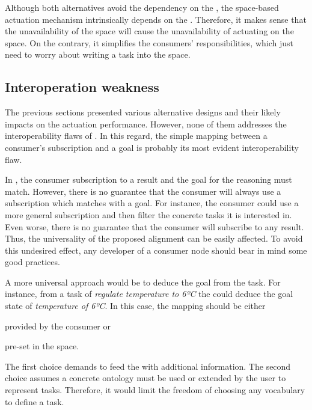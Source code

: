 Although both alternatives avoid the dependency on the \Space{}, the space-based actuation mechanism intrinsically depends on the \Space{}.
Therefore, it makes sense that the unavailability of the space will cause the unavailability of actuating on the space.
On the contrary, it simplifies the consumers' responsibilities, which just need to worry about writing a task into the space.



\subsection{Interoperation weakness}

The previous sections presented various alternative designs and their likely impacts on the actuation performance.
However, none of them addresses the interoperability flaws of \implMix{}.
In this regard, the simple mapping between a consumer's subscription and a goal is probably its most evident interoperability flaw.


In \implMix{}, the consumer subscription to a result and the goal for the reasoning must match.
However, there is no guarantee that the consumer will always use a subscription which matches with a goal.
For instance, the consumer could use a more general subscription and then filter the concrete tasks it is interested in.
Even worse, there is no guarantee that the consumer will subscribe to any result.
Thus, the universality of the proposed alignment can be easily affected.
To avoid this undesired effect, any developer of a consumer node should bear in mind some good practices. %


A more universal approach would be to deduce the goal from the task. %
For instance, from a task of \emph{regulate temperature to 6ºC} the \Space{} could deduce the goal state of \emph{temperature of 6ºC}.
In this case, the mapping should be either
\begin{enumerate*}[label=\itshape(\arabic*\upshape)]
  \item provided by the consumer or
  \item pre-set in the space.
\end{enumerate*}
The first choice demands to feed the \Space{} with additional information. %
The second choice assumes a concrete ontology must be used or extended by the user to represent tasks.
Therefore, it would limit the freedom of choosing any vocabulary to define a task.


